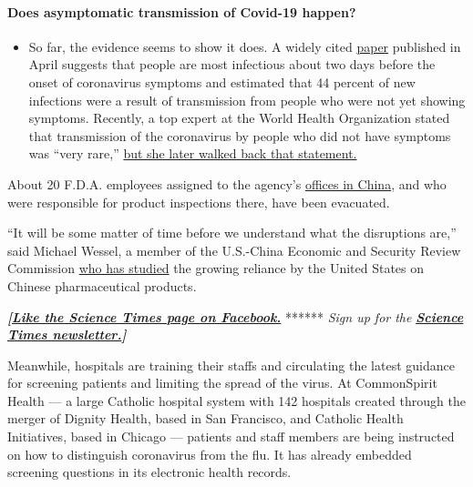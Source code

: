 \begin{itemize}
{  \paragraph{Does asymptomatic transmission of Covid-19
  happen?}\label{does-asymptomatic-transmission-of-covid-19-happen}}

  \begin{itemize}
  \tightlist
  \item
    So far, the evidence seems to show it does. A widely cited
    \href{https://www.nature.com/articles/s41591-020-0869-5}{paper}
    published in April suggests that people are most infectious about
    two days before the onset of coronavirus symptoms and estimated that
    44 percent of new infections were a result of transmission from
    people who were not yet showing symptoms. Recently, a top expert at
    the World Health Organization stated that transmission of the
    coronavirus by people who did not have symptoms was ``very rare,''
    \href{https://www.nytimes.com/2020/06/09/world/coronavirus-updates.html?action=click\&pgtype=Article\&state=default\&region=MAIN_CONTENT_3\&context=storylines_faq\#link-1f302e21}{but
    she later walked back that statement.}
  \end{itemize}
\end{itemize}

About 20 F.D.A. employees assigned to the agency's
\href{https://www.nytimes.com/2008/11/19/world/asia/19iht-beijing.1.17954828.html}{offices
in China}, and who were responsible for product inspections there, have
been evacuated.

``It will be some matter of time before we understand what the
disruptions are,'' said Michael Wessel, a member of the U.S.-China
Economic and Security Review Commission
\href{https://www.uscc.gov/hearings/exploring-growing-us-reliance-chinas-biotech-and-pharmaceutical-products}{who
has studied} the growing reliance by the United States on Chinese
pharmaceutical products.

\textbf{\emph{{[}}\href{http://on.fb.me/1paTQ1h}{\emph{Like the Science
Times page on Facebook.}}} ****** \emph{\textbar{} Sign up for the}
\textbf{\href{http://nyti.ms/1MbHaRU}{\emph{Science Times
newsletter.}}\emph{{]}}}

Meanwhile, hospitals are training their staffs and circulating the
latest guidance for screening patients and limiting the spread of the
virus. At CommonSpirit Health --- a large Catholic hospital system with
142 hospitals created through the merger of Dignity Health, based in San
Francisco, and Catholic Health Initiatives, based in Chicago ---
patients and staff members are being instructed on how to distinguish
coronavirus from the flu. It has already embedded screening questions in
its electronic health records.

